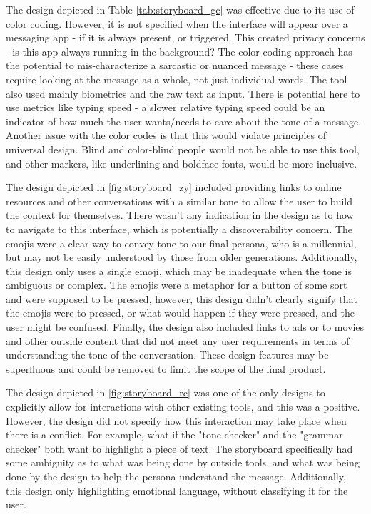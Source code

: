 \documentclass[acmsmall,screen,authorversion,nonacm]{acmart}
\begin{document}
The design depicted in Table \ref{tab:storyboard_gc} was effective due to its use of color coding. However, it is not specified when the interface will appear over a messaging app - if it is always present, or triggered. This created privacy concerns - is this app always running in the background? The color coding approach has the potential to mis-characterize a sarcastic or nuanced message - these cases require looking at the message as a whole, not just individual words. The tool also used mainly biometrics and the raw text as input. There is potential here to use metrics like typing speed - a slower relative typing speed could be an indicator of how much the user wants/needs to care about the tone of a message. Another issue with the color codes is that this would violate principles of universal design. Blind and color-blind people would not be able to use this tool, and other markers, like underlining and boldface fonts, would be more inclusive.

The design depicted in \ref{fig:storyboard_zy} included providing links to online resources and other conversations with a similar tone to allow the user to build the context for themselves. There wasn't any indication in the design as to how to navigate to this interface, which is potentially a discoverability concern. The emojis were a clear way to convey tone to our final persona, who is a millennial, but may not be easily understood by those from older generations. Additionally, this design only uses a single emoji, which may be inadequate when the tone is ambiguous or complex. The emojis were a metaphor for a button of some sort and were supposed to be pressed, however, this design didn't clearly signify that the emojis were to pressed, or what would happen if they were pressed, and the user might be confused. Finally, the design also included links to ads or to movies and other outside content that did not meet any user requirements in terms of understanding the tone of the conversation. These design features may be superfluous and could be removed to limit the scope of the final product.

The design depicted in \ref{fig:storyboard_rc} was one of the only designs to explicitly allow for interactions with other existing tools, and this was a positive. However, the design did not specify how this interaction may take place when there is a conflict. For example, what if the "tone checker" and the "grammar checker" both want to highlight a piece of text. The storyboard specifically had some ambiguity as to what was being done by outside tools, and what was being done by the design to help the persona understand the message. Additionally, this design only highlighting emotional language, without classifying it for the user.
\end{document}
